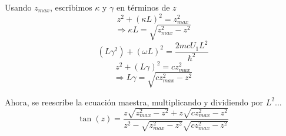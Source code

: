 Usando $z_{max}$, escribimos $\kappa$ y $\gamma$ en términos de $z$
\begin{equation*}
z^2 + (\kappa L)^2 = z_{max}^2
\end{equation*}
\begin{equation*}
\Rightarrow \boxed{\kappa L = \sqrt{z_{max}^2 - z^2}}
\end{equation*}
\begin{equation*}
(L\gamma^2) + (\omega L)^2 = \frac{2mcU_1L^2}{\hbar^2}
\end{equation*}
\begin{equation*}
z^2 + (L\gamma)^2 = cz_{max}^2
\end{equation*}
\begin{equation*}
\boxed{\Rightarrow L\gamma = \sqrt{cz_{max}^2 - z^2}}
\end{equation*}

Ahora, se reescribe la ecuación maestra, multiplicando y dividiendo por $L^2$...
\begin{equation}
\boxed{\tan(z) = \frac{z\sqrt{z_{max}^2 - z^2} + z\sqrt{cz_{max}^2 - z^2}}{z^2 - \sqrt{z_{max}^2 - z^2}\sqrt{cz_{max}^2 - z^2}}}
\end{equation}



